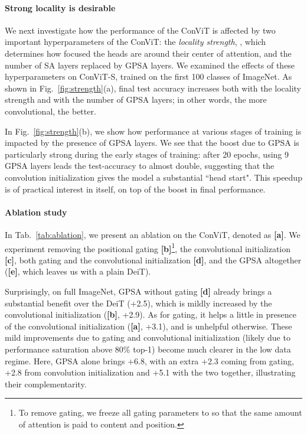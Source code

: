 \paragraph{Strong locality is desirable}

We next investigate how the performance of the ConViT is affected by two important hyperparameters of the ConViT: the \emph{locality strength}, , which determines how focused the heads are around their center of attention, and the number of SA layers replaced by GPSA layers. We examined the effects of these hyperparameters on ConViT-S, trained on the first 100 classes of ImageNet. As shown in Fig.~\ref{fig:strength}(a), final test accuracy increases both with the locality strength and with the number of GPSA layers; in other words, the more convolutional, the better.

In Fig.~\ref{fig:strength}(b), we show how performance at various stages of training is impacted by the presence of GPSA layers. We see that the boost due to GPSA is particularly strong during the early stages of training: after 20 epochs, using 9 GPSA layers leads the test-accuracy to almost double, suggesting that the convolution initialization gives the model a substantial ``head start". This speedup is of practical interest in itself, on top of the boost in final performance.

\paragraph{Ablation study}
In Tab.~\ref{tab:ablation}, we present an ablation on the ConViT, denoted as \textbf{[a]}. We experiment removing the positional gating \textbf{[b]}\footnote{To remove gating, we freeze all gating parameters to  so that the same amount of attention is paid to content and position.}, the convolutional initialization \textbf{[c]}, both gating and the convolutional initialization \textbf{[d]}, and the GPSA altogether (\textbf{[e]}, which leaves us with a plain DeiT). 

Surprisingly, on full ImageNet, GPSA without gating \textbf{[d]} already brings a substantial benefit over the DeiT (+2.5), which is mildly increased by the convolutional initialization (\textbf{[b]}, +2.9). As for gating, it helps a little in presence of the convolutional initialization (\textbf{[a]}, +3.1), and is unhelpful otherwise. These mild improvements due to gating and convolutional initialization (likely due to performance saturation above 80\% top-1) become much clearer in the low data regime. Here, GPSA alone brings +6.8, with an extra +2.3 coming from gating, +2.8 from convolution initialization and +5.1 with the two together, illustrating their complementarity. 


